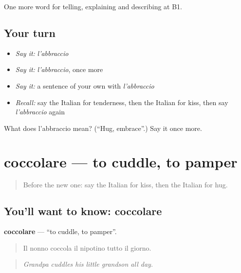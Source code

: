 \begin{grammarlens}[title={What you've built}]
One more word for telling, explaining and describing at B1.
\end{grammarlens}

\subsection*{Your turn}
\begin{itemize}
\raggedright
  \item \emph{Say it:} \emph{l'abbraccio}
  \item \emph{Say it:} \emph{l'abbraccio}, once more
  \item \emph{Say it:} a sentence of your own with \emph{l'abbraccio}
  \item \emph{Recall:} say the Italian for tenderness, then the Italian for kiss, then say \emph{l'abbraccio} again
\end{itemize}

\begin{tcolorbox}[breakable,colback=teal!4,colframe=teal!35!black,title={Before you move on}]
What does l'abbraccio mean? (\textquotedblleft{}Hug, embrace\textquotedblright{}.) Say it once more.
\end{tcolorbox}
\section[coccolare]{coccolare — to cuddle, to pamper}

\label{lesson:IT-C492-coccolare}



\begin{quote}
Before the new one: say the Italian for kiss, then the Italian for hug.
\end{quote}

\subsection*{You'll want to know: coccolare}
\textbf{coccolare} — \textquotedblleft{}to cuddle, to pamper\textquotedblright{}.

\begin{quote}
Il nonno coccola il nipotino tutto il giorno.
\end{quote}

\begin{quote}
\emph{Grandpa cuddles his little grandson all day.}
\end{quote}


